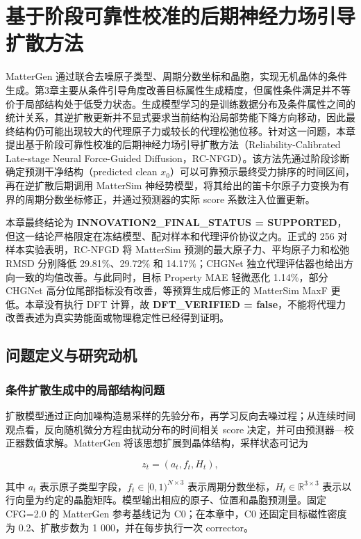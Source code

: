 \chapter{基于阶段可靠性校准的后期神经力场引导扩散方法}

MatterGen 通过联合去噪原子类型、周期分数坐标和晶胞，实现无机晶体的条件生成\citep{zeni2025}。第3章主要从条件引导角度改善目标属性生成精度，但属性条件满足并不等价于局部结构处于低受力状态。生成模型学习的是训练数据分布及条件属性之间的统计关系，其逆扩散更新并不显式要求当前结构沿局部势能下降方向移动，因此最终结构仍可能出现较大的代理原子力或较长的代理松弛位移。针对这一问题，本章提出基于阶段可靠性校准的后期神经力场引导扩散方法（Reliability-Calibrated Late-stage Neural Force-Guided Diffusion，RC-NFGD）。该方法先通过阶段诊断确定预测干净结构（predicted clean \(x_0\)）可以可靠预示最终受力排序的时间区间，再在逆扩散后期调用 Matter\allowbreak Sim 神经势模型，将其给出的笛卡尔原子力变换为有界的周期分数坐标修正，并通过预测器的实际 score 系数注入位置更新。

本章最终结论为 \textbf{INNOVATION2\_FINAL\_STATUS = SUP\allowbreak PORTED}，但这一结论严格限定在冻结模型、配对样本和代理评价协议之内。正式的 256 对样本实验表明，RC-NFGD 将 Matter\allowbreak Sim 预测的最大原子力、平均原子力和松弛 RMSD 分别降低 29.81\%、29.72\% 和 14.17\%；CHGNet 独立代理评估器也给出方向一致的均值改善。与此同时，目标 Property MAE 轻微恶化 1.14\%，部分 CHGNet 高分位尾部指标没有改善，等预算生成后修正的 Matter\allowbreak Sim MaxF 更低。本章没有执行 DFT 计算，故 \textbf{DFT\_VERIFIED = false}，不能将代理力改善表述为真实势能面或物理稳定性已经得到证明。

\section{问题定义与研究动机}

\subsection{条件扩散生成中的局部结构问题}

扩散模型通过正向加噪构造易采样的先验分布，再学习反向去噪过程\citep{ho2020}；从连续时间观点看，反向随机微分方程由扰动分布的时间相关 score 决定，并可由预测器---校正器数值求解\citep{song2021}。MatterGen 将该思想扩展到晶体结构，采样状态可记为

\[
z_t=(a_t,f_t,H_t),
\]

其中 \(a_t\) 表示原子类型字段，\(f_t\in[0,1)^{N\times3}\) 表示周期分数坐标，\(H_t\in\mathbb{R}^{3\times3}\) 表示以行向量为约定的晶胞矩阵。模型输出相应的原子、位置和晶胞预测量。固定 CFG=2.0 的 MatterGen 参考基线记为 C0；在本章中，C0 还固定目标磁性密度为 0.2、扩散步数为 1 000，并在每步执行一次 corrector。

